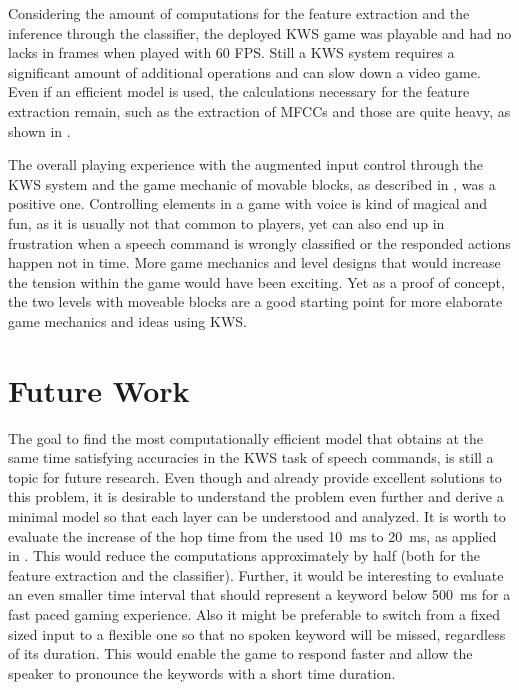 Considering the amount of computations for the feature extraction and the inference through the classifier, the deployed KWS game was playable and had no lacks in frames when played with 60 FPS.
Still a KWS system requires a significant amount of additional operations and can slow down a video game.
Even if an efficient model is used, the calculations necessary for the feature extraction remain, such as the extraction of MFCCs and those are quite heavy, as shown in .

The overall playing experience with the augmented input control through the KWS system and the game mechanic of movable blocks, as described in , was a positive one.
Controlling elements in a game with voice is kind of magical and fun, as it is usually not that common to players, yet can also end up in frustration when a speech command is wrongly classified or the responded actions happen not in time.
More game mechanics and level designs that would increase the tension within the game would have been exciting.
Yet as a proof of concept, the two levels with moveable blocks are a good starting point for more elaborate game mechanics and ideas using KWS.



\section{Future Work}
The goal to find the most computationally efficient model that obtains at the same time satisfying accuracies in the KWS task of speech commands, is still a topic for future research.
Even though \cite{Zhang2017} and \cite{Peter2020} already provide excellent solutions to this problem, it is desirable to understand the problem even further and derive a minimal model so that each layer can be understood and analyzed.
It is worth to evaluate the increase of the hop time from the used \SI{10}{\milli\second} to \SI{20}{\milli\second}, as applied in \cite{Peter2020}.
This would reduce the computations approximately by half (both for the feature extraction and the classifier).
Further, it would be interesting to evaluate an even smaller time interval that should represent a keyword below \SI{500}{\milli\second} for a fast paced gaming experience.
Also it might be preferable to switch from a fixed sized input to a flexible one so that no spoken keyword will be missed, regardless of its duration.
This would enable the game to respond faster and allow the speaker to pronounce the keywords with a short time duration.

